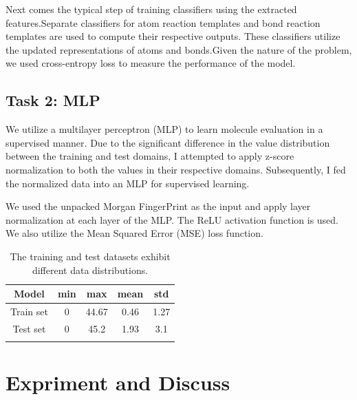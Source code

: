 \documentclass{article}
\begin{document}
Next comes the typical step of training classifiers using the extracted features.Separate classifiers for atom reaction templates and bond reaction templates are used to compute their respective outputs. These classifiers utilize the updated representations of atoms and bonds.Given the nature of the problem, we used cross-entropy loss to measure the performance of the model.

\subsection{Task 2: MLP}

We utilize a multilayer perceptron (MLP) to learn molecule evaluation in a supervised manner. Due to the significant difference in the value distribution between the training and test domains, I attempted to apply z-score normalization to both the values in their respective domains. Subsequently, I fed the normalized data into an MLP for supervised learning.

We used the unpacked Morgan FingerPrint as the input and apply layer normalization at each layer of the MLP. The ReLU activation function is used. We also utilize the Mean Squared Error (MSE) loss function.

\begin{table}[H]
  \centering
  \caption{The training and test datasets exhibit different data distributions.}
  \begin{tabular}{ccccc}
  \hline
  \multicolumn{1}{|c|}{Model}     & \multicolumn{1}{c|}{min} & \multicolumn{1}{c|}{max}   & \multicolumn{1}{c|}{mean} & \multicolumn{1}{c|}{std}  \\ \hline
  \multicolumn{1}{|c|}{Train set} & \multicolumn{1}{c|}{0}   & \multicolumn{1}{c|}{44.67} & \multicolumn{1}{c|}{0.46} & \multicolumn{1}{c|}{1.27} \\ \hline
  \multicolumn{1}{|c|}{Test set}  & \multicolumn{1}{c|}{0}   & \multicolumn{1}{c|}{45.2}  & \multicolumn{1}{c|}{1.93} & \multicolumn{1}{c|}{3.1}  \\ \hline
  \multicolumn{1}{l}{}            & \multicolumn{1}{l}{}     & \multicolumn{1}{l}{}       & \multicolumn{1}{l}{}      & \multicolumn{1}{l}{}     
  \end{tabular}
  \end{table}


\section{Expriment and Discuss}
\end{document}
